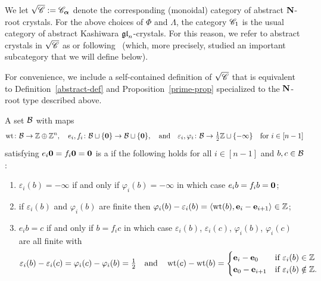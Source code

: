\documentclass[11pt]{article}
\begin{document}
We let  $\sqrt{\mathscr{C}} := \mathscr{C}_{\boldsymbol{\alpha}}$ denote the corresponding (monoidal) category of abstract $\mathbf{N}$-root crystals.
For the above choices of $\Phi$ and $\Lambda$, the category $\mathscr{C}_1$ is the usual category of abstract Kashiwara $\mathfrak{gl}_n$-crystals.
For this reason, we refer to abstract crystals in $\sqrt{\mathscr{C}}$ as  or  following~\cite{MT2023,MTY} (which, more precisely, studied an important subcategory that we will define below).


For convenience, we 
include a self-contained definition of $\sqrt{\mathscr{C}}$ that
is equivalent to Definition~\ref{abstract-def} and Proposition~\ref{prime-prop}
specialized to
 the $\mathbf{N}$-root type described above.


\begin{definition} 
\label{square-root-def}
A set $\mathcal{B}$ with maps
\[
\operatorname{wt} \colon  \mathcal{B}\to \mathbb{Z} \oplus \mathbb{Z}^n,
\quad
e_i,f_i \colon  \mathcal{B} \sqcup\{\boldsymbol{0}\}\to \mathcal{B} \sqcup \{\boldsymbol{0}\},
\quad\text{and}\quad
\varepsilon_i, \varphi_i \colon \mathcal{B} \to \tfrac{1}{2}\mathbb{Z} \sqcup \{-\infty\}
\quad\text{for $i \in [n-1]$} 
\]
satisfying $e_i\boldsymbol{0}=f_i\boldsymbol{0}=\boldsymbol{0}$
is a 
if the following holds
for all $i \in [n-1]$ and $b,c \in \mathcal{B}$:
\begin{enumerate}
\item[(1)] $\varepsilon_i(b) = -\infty$ if and only if $\varphi_i(b) = -\infty$ in which case $e_i b = f_i b = \boldsymbol{0}$; 

\item[(2)] if $\varepsilon_i(b)$ and $\varphi_i(b) $ are finite then $\varphi_i(b) - \varepsilon_i(b) = \langle \operatorname{wt}(b), \textbf{e}_i - \textbf{e}_{i+1} \rangle \in \mathbb{Z}$; %
 

\item[(3)] $e_i b = c$ if and only if $b = f_i c$ in which case $\varepsilon_i(b)$, $\varepsilon_i(c)$, $\varphi_i(b)$, $\varphi_i(c)$ are all finite with
\[
\varepsilon_i(b) - \varepsilon_i(c) = \varphi_i(c) - \varphi_i(b) = \tfrac{1}{2}
\quad\text{and}\quad
\operatorname{wt}(c) - \operatorname{wt}(b) = \begin{cases}
 \textbf{e}_i -\textbf{e}_0 &\text{if }\varepsilon_i(b) \in \mathbb{Z} \\
\textbf{e}_0 -\textbf{e}_{i+1} &\text{if }\varepsilon_i(b)\notin\mathbb{Z}.
\end{cases}
\]

\end{enumerate}
\end{definition}
\end{document}
